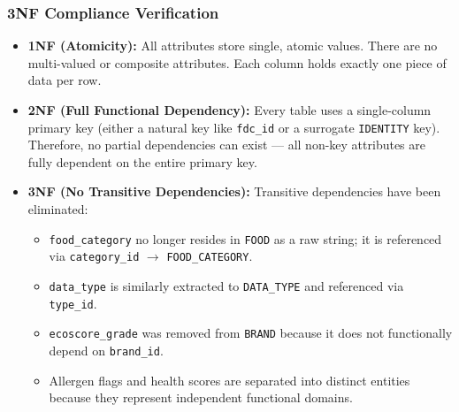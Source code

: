 \subsubsection{3NF Compliance Verification}

\begin{itemize}
    \item \textbf{1NF (Atomicity):} All attributes store single, atomic values. There are no multi-valued or composite attributes. Each column holds exactly one piece of data per row.
    \item \textbf{2NF (Full Functional Dependency):} Every table uses a single-column primary key (either a natural key like \texttt{fdc\_id} or a surrogate \texttt{IDENTITY} key). Therefore, no partial dependencies can exist — all non-key attributes are fully dependent on the entire primary key.
    \item \textbf{3NF (No Transitive Dependencies):} Transitive dependencies have been eliminated:
    \begin{itemize}
        \item \texttt{food\_category} no longer resides in \texttt{FOOD} as a raw string; it is referenced via \texttt{category\_id} $\rightarrow$ \texttt{FOOD\_CATEGORY}.
        \item \texttt{data\_type} is similarly extracted to \texttt{DATA\_TYPE} and referenced via \texttt{type\_id}.
        \item \texttt{ecoscore\_grade} was removed from \texttt{BRAND} because it does not functionally depend on \texttt{brand\_id}.
        \item Allergen flags and health scores are separated into distinct entities because they represent independent functional domains.
    \end{itemize}
\end{itemize}